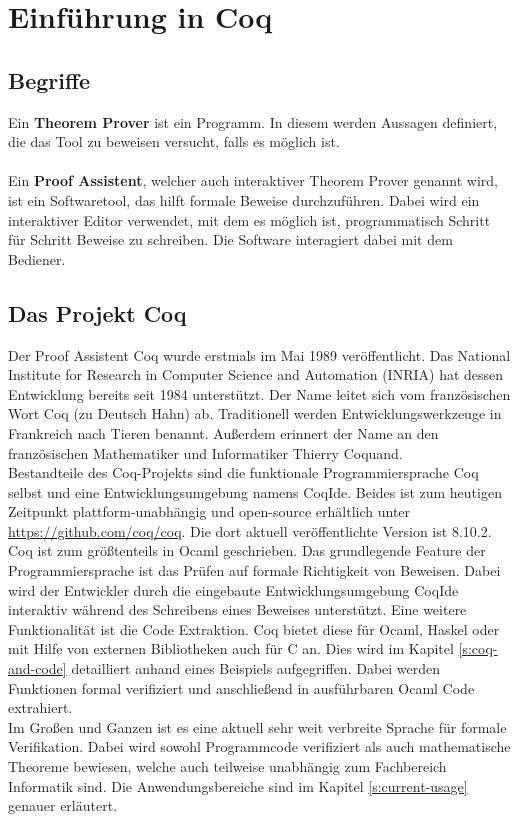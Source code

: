 \section{Einführung in Coq}
\subsection{Begriffe}
Ein \textbf{Theorem Prover} ist ein Programm.
In diesem werden Aussagen definiert, die das Tool zu beweisen versucht, falls es möglich ist.\\
\\
Ein \textbf{Proof Assistent}, welcher auch interaktiver Theorem Prover genannt wird, ist ein Softwaretool, das hilft formale Beweise durchzuführen. Dabei wird ein interaktiver Editor verwendet, mit dem es möglich ist, programmatisch Schritt für Schritt Beweise zu schreiben. Die Software interagiert dabei mit dem Bediener.
 

\subsection{Das Projekt Coq}
Der Proof Assistent Coq wurde erstmals im Mai 1989 veröffentlicht. Das National Institute for Research in Computer Science and Automation (INRIA) hat dessen Entwicklung bereits seit 1984 unterstützt.\cite{COQ02:FV} Der Name leitet sich vom französischen Wort Coq (zu Deutsch Hahn) ab. Traditionell werden Entwicklungswerkzeuge in Frankreich nach Tieren benannt. Außerdem erinnert der Name an den französischen Mathematiker und Informatiker Thierry Coquand. \\
Bestandteile des Coq-Projekts sind die funktionale Programmiersprache Coq selbst und eine Entwicklungsumgebung namens CoqIde. Beides ist zum heutigen Zeitpunkt plattform-unabhängig und open-source erhältlich unter \url{https://github.com/coq/coq}. Die dort aktuell veröffentlichte Version ist 8.10.2.\cite{COQ01:FV}\\
Coq ist zum größtenteils in Ocaml geschrieben. Das grundlegende Feature der Programmiersprache ist das Prüfen auf formale Richtigkeit von Beweisen. Dabei wird der Entwickler durch die eingebaute Entwicklungsumgebung CoqIde interaktiv während des Schreibens eines Beweises unterstützt. Eine weitere Funktionalität ist die Code Extraktion. Coq bietet diese für Ocaml, Haskel oder mit Hilfe von externen Bibliotheken auch für C an. Dies wird im Kapitel \ref{s:coq-and-code} detailliert anhand eines Beispiels aufgegriffen. Dabei werden Funktionen formal verifiziert und anschließend in ausführbaren Ocaml Code extrahiert.\\
Im Großen und Ganzen ist es eine aktuell sehr weit verbreite Sprache für formale Verifikation. Dabei wird sowohl Programmcode verifiziert als auch mathematische Theoreme bewiesen, welche auch teilweise unabhängig zum Fachbereich Informatik sind. Die Anwendungsbereiche sind im Kapitel \ref{s:current-usage} genauer erläutert.

